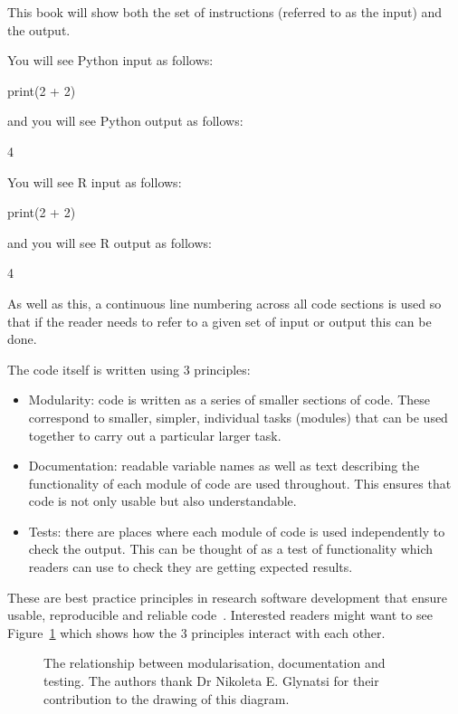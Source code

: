 This book will show both the set of instructions (referred to as the input) and
the output.

You will see Python input as follows:

\begin{pyin}
print(2 + 2)
\end{pyin}

and you will see Python output as follows:

\begin{pyout}
4
\end{pyout}

You will see R input as follows:

\begin{Rin}
print(2 + 2)
\end{Rin}

and you will see R output as follows:

\begin{Rout}
[1] 4
\end{Rout}

As well as this, a continuous line numbering across all code sections is used so
that if the reader needs to refer to a given set of input or output this can be
done.

The code itself is written using 3 principles:

\begin{itemize}
        \item Modularity: code is written as a
              series of smaller sections of code. These correspond to smaller,
              simpler, individual tasks (modules) that can be used together to carry out
              a particular larger task.
        \item Documentation: readable variable names as
              well as
              text describing the functionality of each module of code are used
              throughout. This ensures that code is not only usable but also
              understandable.
          \item Tests: there are places where each module of code is
              used independently to check the output. This can be thought of as a
              test of functionality which readers can use to check they are
              getting expected results.
\end{itemize}

These are best practice principles in research software development
that ensure usable, reproducible and reliable code~\cite{wilson2014best}.
Interested readers might want to see Figure~\ref{fig:rsd-triangle} which shows
how the 3 principles interact with each other.

\begin{figure}
    \begin{center}
        
        \caption{The relationship between modularisation, documentation and
            testing. The authors thank Dr Nikoleta E. Glynatsi for their contribution to
            the drawing of this diagram.}
        \label{fig:rsd-triangle}
    \end{center}
\end{figure}
